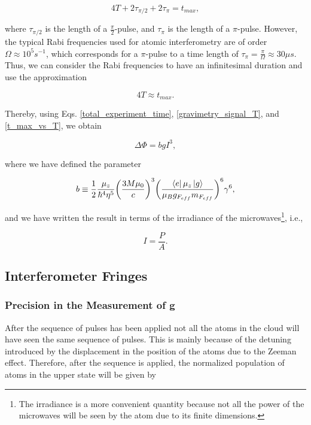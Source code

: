 \documentclass{article}
\begin{document}
\begin{equation}
    4 T + 2\tau_{\pi/2} + 2\tau_{\pi} = t_{max},
\end{equation}

where $\tau_{\pi/2}$ is the length of a $\frac{\pi}{2}$-pulse, and $\tau_{\pi}$ is the length of a $\pi$-pulse. However, the typical Rabi frequencies used for atomic interferometry are of order $\Omega \approx 10^5 s^{-1}$, which corresponds for a $\pi$-pulse to a time length of $\tau_{\pi} = \frac{\pi}{\Omega} \approx 30 \mu s$. Thus, we can consider the Rabi frequencies to have an infinitesimal duration and use the approximation

\begin{equation}\label{t_max_vs_T}
    4T \approx t_{max}.
\end{equation}

Thereby, using Eqs. \ref{total_experiment_time}, \ref{gravimetry_signal_T}, and \ref{t_max_vs_T}, we obtain

\begin{equation}\label{gravimetry_signal_irradiance}
    \Delta \Phi = b g I^3, 
\end{equation}

where we have defined the parameter

\begin{equation}
    b \equiv \frac{1}{2} \frac{ \mu_{z}}{ \hbar^{4} \eta^{5}} \bigg(\frac{3M \mu_{0}}{c} \bigg)^{3} \bigg(\frac{\bra{e} \mu_{z} \ket{g}}{\mu_{B} g_{F_{eff}} m_{F_{eff}}} \bigg)^{6} \gamma^6,
\end{equation}

and we have written the result in terms of the irradiance of the microwaves\footnote{The irradiance is a more convenient quantity because not all the power of the microwaves will be seen by the atom due to its finite dimensions.}, i.e.,

\begin{equation}
    I = \frac{P}{A}.
\end{equation}

\subsection{Interferometer Fringes}
\subsubsection{Precision in the Measurement of g}
After the sequence of pulses has been applied not all the atoms in the cloud will have seen the same sequence of pulses. This is mainly because of the detuning introduced by the displacement in the position of the atoms due to the Zeeman effect. Therefore, after the sequence is applied, the normalized population of atoms in the upper state will be given by
\end{document}
